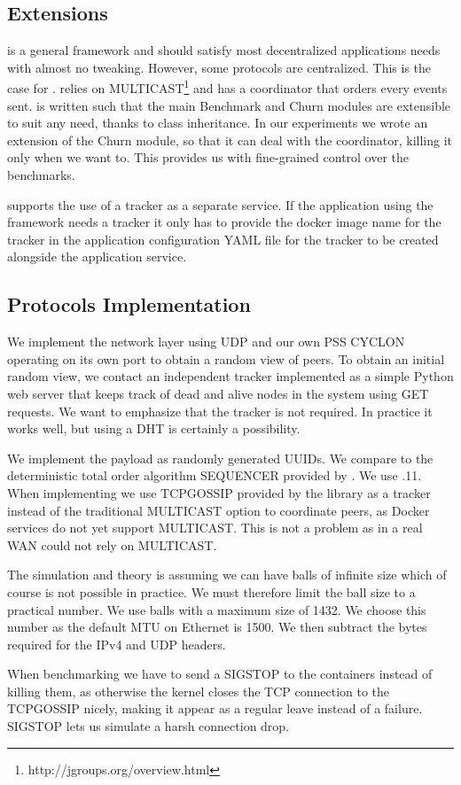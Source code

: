 \subsection{Extensions}
\sys is a general framework and should satisfy most decentralized applications needs with almost no tweaking. However, some protocols are centralized. This is the case for \jgroups. \jgroups relies on MULTICAST\footnote{http://jgroups.org/overview.html} and has a coordinator that orders every events sent. \sys is written such that the main Benchmark and Churn modules are extensible to suit any need, thanks to class inheritance. In our experiments we wrote an extension of the Churn module, so that it can deal with the coordinator, killing it only when we want to. This provides us with fine-grained control over the benchmarks. 

\sys supports the use of a tracker as a separate service. If the application using the framework needs a tracker it only has to provide the docker image name for the tracker in the application configuration YAML file for the tracker to be created alongside the application service.
\subsection{Protocols Implementation}
We implement the network layer using UDP and our own PSS CYCLON operating on its own port to obtain a random view of peers. To obtain an initial random view, we contact an independent tracker implemented as a simple Python web server that keeps track of dead and alive nodes in the system using GET requests. We want to emphasize that the tracker is not required. In practice it works well, but using a DHT is certainly a possibility.

We implement the payload as randomly generated UUIDs. We compare \epto to the deterministic total order algorithm SEQUENCER provided by \jgroups. We use .11. When implementing \jgroups we use TCPGOSSIP \autocite{tcpgossip} provided by the \jgroups library as a tracker instead of the traditional MULTICAST option to coordinate peers, as Docker services do not yet support MULTICAST. This is not a problem as in a real WAN \jgroups could not rely on MULTICAST.

The \epto simulation and theory is assuming we can have balls of infinite size which of course is not possible in practice.
We must therefore limit the ball size to a practical number. We use balls with a maximum size of \SI{1432}{\byte}. We choose this number as the default MTU on Ethernet is \SI{1500}{\byte}. We then subtract the bytes required for the IPv4 and UDP headers.

When benchmarking \jgroups we have to send a SIGSTOP to the containers instead of killing them, as otherwise the kernel closes the TCP connection to the TCPGOSSIP nicely, making it appear as a regular leave instead of a failure. SIGSTOP lets us simulate a harsh connection drop.
